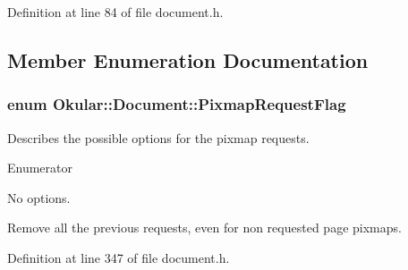 Definition at line 84 of file document.\+h.



\subsection{Member Enumeration Documentation}
\hypertarget{classOkular_1_1Document_a34c1f67c024cfbdd46379c5fac3674d7}{
\subsubsection[{Pixmap\+Request\+Flag}]{\setlength{\rightskip}{0pt plus 5cm}enum {\bf Okular\+::\+Document\+::\+Pixmap\+Request\+Flag}}}\label{classOkular_1_1Document_a34c1f67c024cfbdd46379c5fac3674d7}
Describes the possible options for the pixmap requests. \begin{Desc}
\item[Enumerator]\par
\begin{description}
\item[{\em 
\hypertarget{classOkular_1_1Document_a34c1f67c024cfbdd46379c5fac3674d7a87c3cee454d9bacfd7e9642eb697abb0}{No\+Option}\label{classOkular_1_1Document_a34c1f67c024cfbdd46379c5fac3674d7a87c3cee454d9bacfd7e9642eb697abb0}
}]No options. \item[{\em 
\hypertarget{classOkular_1_1Document_a34c1f67c024cfbdd46379c5fac3674d7a3e895c552ec2119c4a743aaefa3d00af}{Remove\+All\+Previous}\label{classOkular_1_1Document_a34c1f67c024cfbdd46379c5fac3674d7a3e895c552ec2119c4a743aaefa3d00af}
}]Remove all the previous requests, even for non requested page pixmaps. \end{description}
\end{Desc}


Definition at line 347 of file document.\+h.


